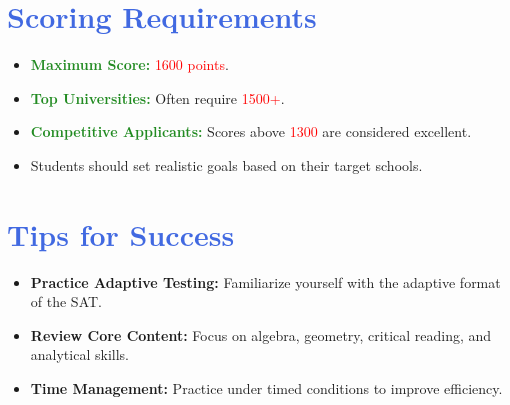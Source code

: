 \documentclass{article}
\begin{document}
\section*{\textcolor{RoyalBlue}{Scoring Requirements}}
\begin{tcolorbox}[colback=Lavender!5, colframe=RoyalBlue, title=\textbf{Scoring Benchmarks}]
\begin{itemize}
    \item \textcolor{ForestGreen}{\textbf{Maximum Score:}} \textcolor{Red}{1600 points}.
    \item \textcolor{ForestGreen}{\textbf{Top Universities:}} Often require \textcolor{Red}{1500+}.
    \item \textcolor{ForestGreen}{\textbf{Competitive Applicants:}} Scores above \textcolor{Red}{1300} are considered excellent.
    \item Students should set realistic goals based on their target schools.
\end{itemize}
\end{tcolorbox}

\vspace{0.8cm}

\section*{\textcolor{RoyalBlue}{Tips for Success}}
\begin{tcolorbox}[colback=Lavender!10, colframe=RoyalBlue, title=\textbf{Preparation Tips}]
\begin{itemize}
    \item \textbf{Practice Adaptive Testing:} Familiarize yourself with the adaptive format of the SAT.
    \item \textbf{Review Core Content:} Focus on algebra, geometry, critical reading, and analytical skills.
    \item \textbf{Time Management:} Practice under timed conditions to improve efficiency.
\end{itemize}
\end{tcolorbox}

\vspace{0.5cm}
\end{document}

